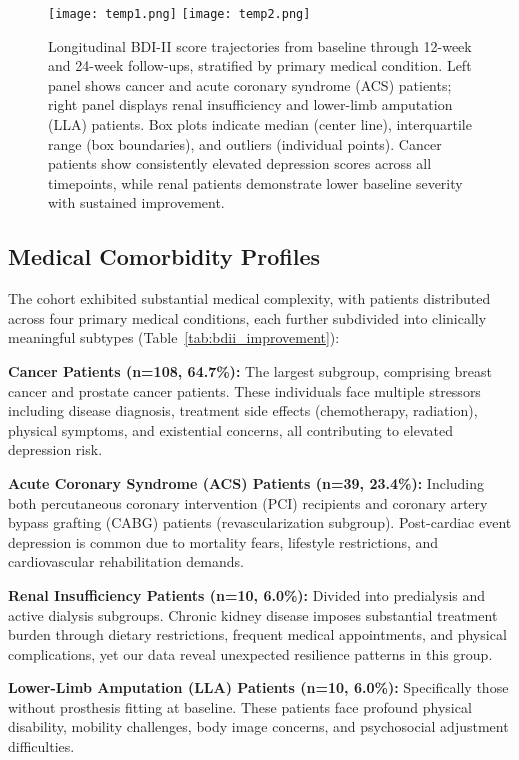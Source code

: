 \documentclass[conference]{IEEEtran}
\begin{document}
\begin{figure}[t]
    \centering
    \texttt{[image: temp1.png]}
    \texttt{[image: temp2.png]}
    \caption{Longitudinal BDI-II score trajectories from baseline through 12-week and 24-week follow-ups, stratified by primary medical condition. Left panel shows cancer and acute coronary syndrome (ACS) patients; right panel displays renal insufficiency and lower-limb amputation (LLA) patients. Box plots indicate median (center line), interquartile range (box boundaries), and outliers (individual points). Cancer patients show consistently elevated depression scores across all timepoints, while renal patients demonstrate lower baseline severity with sustained improvement.}
    \label{fig:bdi_distri_hospital}
\end{figure}

\subsection{Medical Comorbidity Profiles}

The cohort exhibited substantial medical complexity, with patients distributed across four primary medical conditions, each further subdivided into clinically meaningful subtypes (Table~\ref{tab:bdii_improvement}):

\textbf{Cancer Patients (n=108, 64.7\%):} The largest subgroup, comprising breast cancer and prostate cancer patients. These individuals face multiple stressors including disease diagnosis, treatment side effects (chemotherapy, radiation), physical symptoms, and existential concerns, all contributing to elevated depression risk.

\textbf{Acute Coronary Syndrome (ACS) Patients (n=39, 23.4\%):} Including both percutaneous coronary intervention (PCI) recipients and coronary artery bypass grafting (CABG) patients (revascularization subgroup). Post-cardiac event depression is common due to mortality fears, lifestyle restrictions, and cardiovascular rehabilitation demands.

\textbf{Renal Insufficiency Patients (n=10, 6.0\%):} Divided into predialysis and active dialysis subgroups. Chronic kidney disease imposes substantial treatment burden through dietary restrictions, frequent medical appointments, and physical complications, yet our data reveal unexpected resilience patterns in this group.

\textbf{Lower-Limb Amputation (LLA) Patients (n=10, 6.0\%):} Specifically those without prosthesis fitting at baseline. These patients face profound physical disability, mobility challenges, body image concerns, and psychosocial adjustment difficulties.
\end{document}
